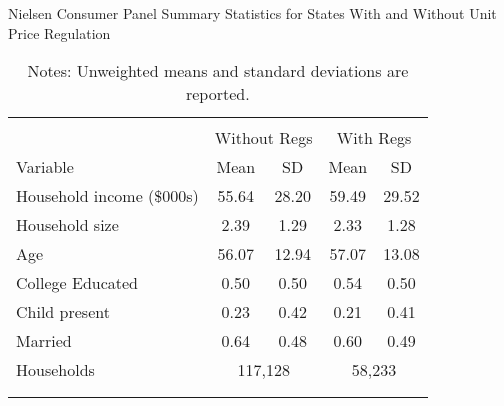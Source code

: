 \begin{table}[!htbp] \centering
\caption{Nielsen Consumer Panel Summary Statistics for States With and Without Unit Price Regulation}
\label{tab:summaryStatsUnitLaws}
\begin{tabular}{lcccc}
\\[-1.8ex]\hline
\hline \\[-1.8ex]
                          & \multicolumn{2}{c}{Without Regs} & \multicolumn{2}{c}{With Regs} \\
Variable                  & Mean  & SD    & Mean    & SD \\
\hline
Household income (\$000s) & 55.64 & 28.20 & 59.49   & 29.52  \\
Household size            & 2.39  & 1.29  & 2.33    & 1.28   \\
Age                       & 56.07 & 12.94 & 57.07   & 13.08  \\
College Educated          & 0.50  & 0.50  & 0.54    & 0.50   \\
Child present             & 0.23  & 0.42  & 0.21    & 0.41   \\
Married                   & 0.64  & 0.48  & 0.60    & 0.49 \\
Households                & \multicolumn{2}{c}{117,128} & \multicolumn{2}{c}{58,233}\\
\\[-1.8ex]\hline
\hline \\[-1.8ex]
\end{tabular}
\caption*{Notes: Unweighted means and standard deviations are reported.}
\end{table}
